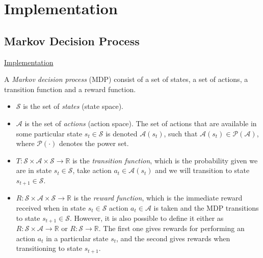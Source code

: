 \documentclass{article}
\newcommand{\GithubURL}[2]{
\noindent
\href{https://github.com/davidrobles/mlnd-capstone-code/blob/master/#1}{#2}
\break
}
\begin{document}
\section{Implementation}

\subsection{Markov Decision Process}

\GithubURL{capstone/mdp/mdp.py}{Implementation}

A \emph{Markov decision process} (MDP) consist of a set of states, a set of actions, a transition
function and a reward function.

\begin{itemize}

    \item $\mathcal{S}$ is the set of \emph{states} (state space).

    \item $\mathcal{A}$ is the set of \emph{actions} (action space). The set of actions that are
      available in some particular state $s_t \in \mathcal{S}$ is denoted $\mathcal{A}(s_t)$, such
      that $\mathcal{A}(s_t) \in \mathcal{P}(\mathcal{A})$, where $\mathcal{P}(\cdot)$ denotes the
      power set.

    \item $ T : \mathcal{S} \times \mathcal{A} \times \mathcal{S} \to \mathbb{R}$ is the
      \emph{transition function}, which is the probability given we are in state $s_t \in
      \mathcal{S}$, take action $a_t \in \mathcal{A}(s_t)$ and we will transition to state $s_{t+1}
      \in \mathcal{S}$.

    \item $ R : \mathcal{S} \times \mathcal{A} \times \mathcal{S} \to \mathbb{R}$ is the
      \emph{reward function}, which is the immediate reward received when in state $s_t \in
      \mathcal{S}$ action $a_t \in \mathcal{A}$ is taken and the MDP transitions to state $s_{t+1}
      \in \mathcal{S}$. However, it is also possible to define it either as $ R : \mathcal{S} \times
      \mathcal{A} \to \mathbb{R}$ or $R : \mathcal{S} \to \mathbb{R}$. The first one gives rewards
      for performing an action $a_t$ in a particular state $s_t$, and the second gives rewards when
      transitioning to state $s_{t+1}$.

\end{itemize}
\end{document}
